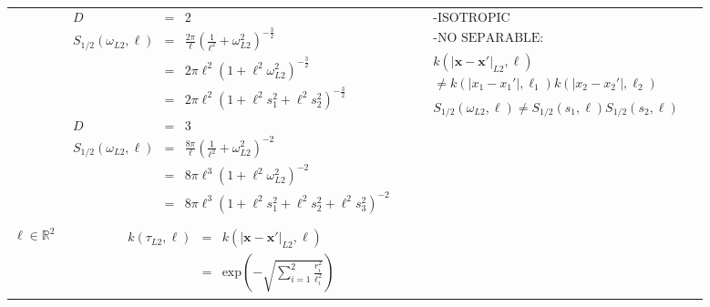 \documentclass[]{interact}
\theoremstyle{plain}%
\theoremstyle{definition}
\theoremstyle{remark}
\begin{document}
\begin{landscape}
\begin{table}[H]
\begin{center}
\begin{tabular}{|c|c|c|c|}
       & \multicolumn{1}{|p{8.2cm}|}{\small
         \begin{eqnarray*}
		D &=& 2\\
		S_{1/2}(\omega_{L2},\ell) &=& \frac{2\pi}{\ell}\left(\frac{1}{\ell^2}+\omega_{L2}^2 \right)^{-\frac{3}{2}} \\
		&=& 2\pi\ell^2\left(1+\ell^2\omega_{L2}^2\right)^{-\frac{3}{2}} \\
		&=& 2\pi\ell^2\left(1+\ell^2s_{1}^2+\ell^2s_{2}^2\right)^{-\frac{3}{2}} \\
		\\
		D &=& 3\\
		S_{1/2}(\omega_{L2},\ell) &=& \frac{8\pi}{\ell}\left(\frac{1}{\ell^2}+\omega_{L2}^2 \right)^{-2} \\
		&=& 8\pi\ell^3\left(1+\ell^2\omega_{L2}^2\right)^{-2} \\
		&=& 8\pi\ell^3\left(1+\ell^2s_{1}^2+\ell^2s_{2}^2+\ell^2s_{3}^2\right)^{-2} 
         \end{eqnarray*}
       }
       
       & \multicolumn{1}{|p{6.2cm}|}{\small
         \begin{eqnarray*}
        &&\text{-ISOTROPIC}\\
        \\
		&&\text{-NO SEPARABLE:} \\
		\\
		&&k(|\bm{x}-\bm{x}'|_{L2},\bm{\ell})\\
		 &&\neq k(|x_1-x_1'|,\ell_1)k(|x_2-x_2'|,\ell_2)\\
		 \\
		&&S_{1/2}(\omega_{L2},\ell)\neq S_{1/2}(s_1,\ell)S_{1/2}(s_2,\ell)
         \end{eqnarray*}
       }\\
       \vspace{-10mm}\\
        \cline{1-3}
         
       \multicolumn{1}{|p{1.5cm}|}{
       \vspace{1mm}
       $\bm{\ell} \in \mathbb{R}^2$
       }
       
         & \multicolumn{1}{|p{7.2cm}|}{\small
         \begin{eqnarray*}
		k(\tau_{L2},\bm{\ell}) &=& k(|\bm{x}-\bm{x}'|_{L2},\bm{\ell})\\
		&=& \mathrm{exp}\left(-\sqrt{\sum_{i=1}^{2}\frac{r_i^2}{\ell_i^2}} \right)
         \end{eqnarray*}
       }
       

\end{tabular}
\end{center}
\end{table}
\end{landscape}
\end{document}
